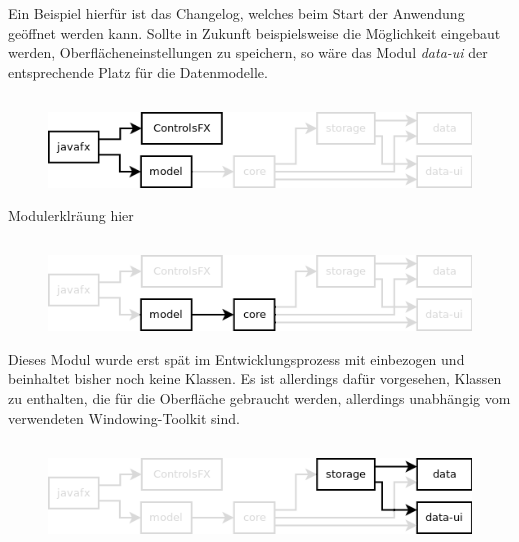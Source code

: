 Ein Beispiel hierfür ist das Changelog, welches beim Start der Anwendung geöffnet werden kann.
Sollte in Zukunft beispielsweise die Möglichkeit eingebaut werden, Oberflächeneinstellungen zu speichern, 
so wäre das Modul \textit{data-ui} der entsprechende Platz für die Datenmodelle.

\subsection{\textModJavaFX}
\label{\textModJavaFX}
\begin{figure}[h!]
	\centering
	\includegraphics[width=.8\textwidth]{module_dependencies_javafx.png}
\end{figure}

Modulerklräung hier




\subsection{\textModModel}
\label{\textModModel}
\begin{figure}[h!]
	\centering
	\includegraphics[width=.8\textwidth]{module_dependencies_model.png}
\end{figure}

Dieses Modul wurde erst spät im Entwicklungsprozess mit einbezogen und beinhaltet bisher noch keine Klassen.
Es ist allerdings dafür vorgesehen, Klassen zu enthalten, die für die Oberfläche gebraucht werden, allerdings
unabhängig vom verwendeten Windowing-Toolkit sind.




\subsection{\textModStorage}
\label{\textModStorage}
\begin{figure}[h!]
	\centering
	\includegraphics[width=.8\textwidth]{module_dependencies_storage.png}
\end{figure}

